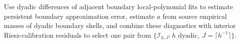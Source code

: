 Use dyadic differences of adjacent boundary local-polynomial fits to estimate persistent boundary approximation error, estimate \(a\) from source empirical masses of dyadic boundary shells, and combine these diagnostics with interior Riesz-calibration residuals to select one pair from \(\{\mathcal I_{h,J}:h\text{ dyadic},\ J=\lceil h^{-1}\rceil\}\).